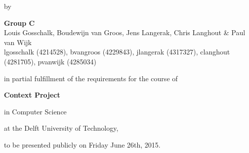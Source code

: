 \begin{titlepage}

\begin{center}


\vspace*{2\bigskipamount}

{\makeatletter
\titlestyle\color{tudelft-cyan}\Huge\@title
\makeatother}

{\makeatletter
\ifx\@subtitle\undefined\else
    \bigskip
    \titlefont\titleshape\LARGE\@subtitle
\fi
\makeatother}

\bigskip
\bigskip

by

\bigskip
\bigskip

{\bfseries Group C} \\
Louis Gosschalk, Boudewijn van Groos, Jens Langerak, Chris Langhout \& Paul van Wijk \\
lgosschalk (4214528), bvangroos (4229843), jlangerak (4317327), clanghout (4281705), pvanwijk (4285034)

\vfill

in partial fulfillment of the requirements for the course of

\bigskip
\bigskip

{\bfseries Context Project}

in Computer Science

\bigskip
\bigskip

at the Delft University of Technology,

to be presented publicly on Friday June  26th, 2015.


\end{center}
\end{titlepage}
